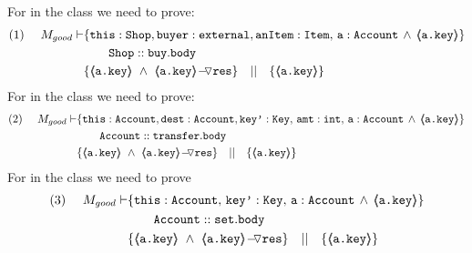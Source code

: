 \begin{proofO}
\noindent
For    in the  class we need to prove:
\small
\begin{align*}
\text{(1)}  \ \ \ \ M_{good} \vdash 
		&	\{  \prg{this}:\prg{Shop}, \prg{buyer} : \prg{external}, \prg{anItem} : \prg{Item},\, \prg{a}:\prg{Account}\,\wedge\, 
				{\inside{\prg{a.key}}} \} \\
		& \SPT \prg{Shop}::\prg{buy}.\prg{body}\ \\  
		& \{ {\inside{\prg{a.key}}}\ \wedge\ {\PushASLong {\prg{res}} {\inside{\prg{a.key}}}}  \} \ \ \  || \ \ \ 
		   \{ {\inside{\prg{a.key}}} \}
\end{align*}
\normalsize
For  in the  class we need to prove:
\small
\begin{align*}
\text{(2)}  \ \ \ \ M_{good} \vdash 
		&	\{  \prg{this}:\prg{Account}, \prg{dest} : \prg{Account}, 
			\prg{key'} : \prg{Key},\, \prg{amt}:\prg{int},\, \prg{a}:\prg{Account}\,
			\wedge\,{\inside{\prg{a.key}}} \} \\
		&\SPT \prg{Account}::\prg{transfer}.\prg{body}\ \\  
		& \{ {\inside{\prg{a.key}}}\ \wedge\ {\PushASLong {\prg{res}} {\inside{\prg{a.key}}}}  \} \ \ \  || \ \ \ 
		   \{ {\inside{\prg{a.key}}} \}
\end{align*}
\normalsize
For  in the  class we need to prove
\small
\begin{align*}
\text{(3)}  \ \ \ \ M_{good} \vdash 
		&	\{  \prg{this}:\prg{Account},\,
			\prg{key'} : \prg{Key},\, \prg{a}:\prg{Account}\,
			\wedge\,{\inside{\prg{a.key}}} \} \\
		& \SPT \prg{Account}::\prg{set}.\prg{body}\ \\  
		& \{ {\inside{\prg{a.key}}}\ \wedge\ {\PushASLong {\prg{res}} {\inside{\prg{a.key}}}}  \} \ \ \  || \ \ \ 
		   \{ {\inside{\prg{a.key}}} \}
\end{align*}
\normalsize


\end{proofO}

